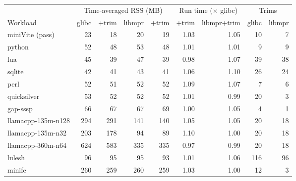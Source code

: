 \begin{tabular}{lrrrrrrrr}
\toprule
 & \multicolumn{4}{c}{Time-averaged RSS (MB)} & \multicolumn{2}{c}{Run time ($\times$ glibc)} & \multicolumn{2}{c}{Trims} \\
\cmidrule(lr){2-5} \cmidrule(lr){6-7} \cmidrule(lr){8-9}
Workload & glibc & +trim & libmpr & +trim & +trim & libmpr+trim & glibc & libmpr \\
\midrule
miniVite (pass) & 23 & 18 & 20 & 19 & 1.03 & 1.05 & 10 & 7 \\
python & 52 & 48 & 53 & 48 & 1.01 & 1.01 & 9 & 9 \\
lua & 45 & 39 & 47 & 39 & 0.98 & 1.07 & 39 & 38 \\
sqlite & 42 & 41 & 43 & 41 & 1.06 & 1.10 & 26 & 24 \\
perl & 52 & 51 & 52 & 52 & 1.09 & 1.07 & 7 & 6 \\
quicksilver & 53 & 52 & 52 & 52 & 1.01 & 0.99 & 20 & 3 \\
\midrule
gap-sssp & 66 & 67 & 67 & 69 & 1.00 & 1.05 & 4 & 1 \\
llamacpp-135m-n128 & 294 & 291 & 141 & 140 & 1.05 & 1.05 & 20 & 18 \\
llamacpp-135m-n32 & 203 & 178 & 94 & 89 & 1.10 & 1.00 & 20 & 18 \\
llamacpp-360m-n64 & 624 & 583 & 335 & 335 & 0.97 & 0.99 & 20 & 18 \\
lulesh & 96 & 95 & 95 & 93 & 1.01 & 1.06 & 116 & 96 \\
minife & 260 & 259 & 260 & 259 & 1.03 & 1.00 & 12 & 3 \\
\bottomrule
\end{tabular}
